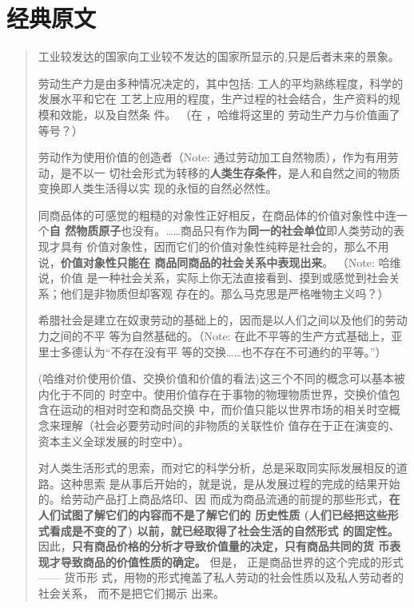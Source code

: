 \chapter{经典原文}

\begin{quotation}
  工业较发达的国家向工业较不发达的国家所显示的,只是后者未来的景象。 

  
劳动生产力是由多种情况决定的，其中包括: 工人的平均熟练程度，科学的发展水平和它在
工艺上应用的程度，生产过程的社会结合，生产资料的规模和效能，以及自然条
件。 （在 ，哈维将这里的
劳动生产力与价值画了等号？）

  劳动作为使用价值的创造者（Note: 通过劳动加工自然物质），作为有用劳动，是不以一
切社会形式为转移的\textbf{人类生存条件}，是人和自然之间的物质变换即人类生活得以实
现的永恒的自然必然性。

  同商品体的可感觉的粗糙的对象性正好相反，在商品体的价值对象性中连一个\textbf{自
然物质原子}也没有。……商品只有作为\textbf{同一的社会单位}即人类劳动的表现才具有
价值对象性，因而它们的价值对象性纯粹是社会的，那么不用说，\textbf{价值对象性只能在
商品同商品的社会关系中表现出来}。 （Note: 哈维说，价值
是一种社会关系，实际上你无法直接看到、摸到或感觉到社会关系；他们是非物质但却客观
存在的。那么马克思是严格唯物主义吗？）

  希腊社会是建立在奴隶劳动的基础上的，因而是以人们之间以及他们的劳动力之间的不平
等为自然基础的。（Note: 在此不平等的生产方式基础上，亚里士多德认为“不存在没有平
等的交换……也不存在不可通约的平等。”）

  (哈维对价使用价值、交换价值和价值的看法)这三个不同的概念可以基本被内化于不同的
时空中。使用价值存在于事物的物理物质世界，交换价值包含在运动的相对时空和商品交换
中，而价值只能以世界市场的相关时空概念来理解（社会必要劳动时间的非物质的关联性价
值存在于正在演变的、资本主义全球发展的时空中）。

  对人类生活形式的思索，而对它的科学分析，总是采取同实际发展相反的道路。这种思索
是从事后开始的，就是说，是从发展过程的完成的结果开始的。给劳动产品打上商品烙印、因
而成为商品流通的前提的那些形式，\textbf{在人们试图了解它们的内容而不是了解它们的
历史性质 (人们已经把这些形式看成是不变的了) 以前，就已经取得了社会生活的自然形式
的固定性。}因此，\textbf{只有商品价格的分析才导致价值量的决定，只有商品共同的货
币表现才导致商品的价值性质的确定。} 但是， 正是商品世界的这个完成的形式—— 货币形
式，用物的形式掩盖了私人劳动的社会性质以及私人劳动者的社会关系， 而不是把它们揭示
出来。


\end{quotation}
